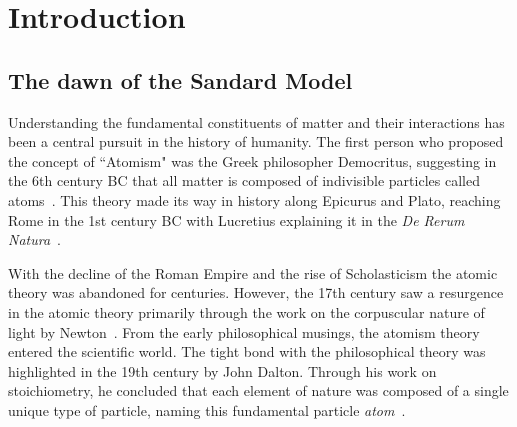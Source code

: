 \renewcommand{\chaptermark}[1]{\markboth{#1}{}}
\renewcommand{\sectionmark}[1]{\markright{#1}}
\fancyhead{} %
\fancyhead[LE]{\chaptername~\thechapter | \leftmark}
\fancyhead[RO]{\thesection~\rightmark}
\fancyfoot{} %
\fancyfoot[LE,RO]{\thepage}

    
\chapter{Introduction}
\label{chp:intro}
\section{The dawn of the Sandard Model}
Understanding the fundamental constituents of matter and their interactions has been a central pursuit in the history of humanity. The first person who proposed the concept of ``Atomism" was the Greek philosopher Democritus, suggesting in the 6th century BC that all matter is composed of indivisible particles called atoms~\cite{laertius1853lives}.
This theory made its way in history along Epicurus and Plato, reaching Rome in the 1st century BC with Lucretius explaining it in the \textit{De Rerum Natura}~\cite{LucretiusCarus+2019}. 

With the decline of the Roman Empire and the rise of Scholasticism the atomic theory was abandoned for centuries. However, the 17th century saw a resurgence in the atomic theory primarily through the work on the corpuscular nature of light by Newton~\cite{Newton1704-NEWO}. From the early philosophical musings, the atomism theory entered the scientific world. The tight bond with the philosophical theory was highlighted in the 19th century by John Dalton. Through his work on stoichiometry, he concluded that each element of nature was composed of a single unique type of particle, naming this fundamental particle \textit{atom}~\cite{Dalton}. 

